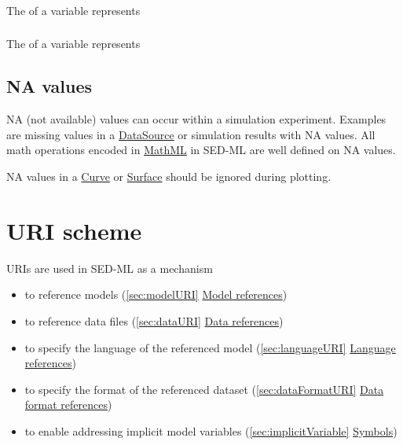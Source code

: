 
\subsubsection*{}
\label{fun:gamma}
The \sedgamma of a variable represents 

\subsubsection*{}
\label{fun:poisson}
The \poisson of a variable represents 




\subsection{NA values}
NA (not available) values can occur within a simulation experiment. Examples are missing values in a \hyperref[class:dataSource]{DataSource} or simulation results with NA values. All math operations encoded in \hyperref[sec:mathML]{MathML} in SED-ML are well defined on NA values. 

NA values in a \hyperref[class:curve]{Curve} or \hyperref[class:surface]{Surface} should be ignored during plotting.
  
\section{URI scheme}  
\label{sec:uriScheme}
URIs are used in SED-ML as a mechanism
\begin{itemize}
	\item to reference models (\ref{sec:modelURI} \hyperref[sec:modelURI]{Model references})
	\item to reference data files (\ref{sec:dataURI} \hyperref[sec:dataURI]{Data references})
	\item to specify the language of the referenced model (\ref{sec:languageURI} \hyperref[sec:languageURI]{Language references})
	\item to specify the format of the referenced dataset (\ref{sec:dataFormatURI} \hyperref[sec:dataFormatURI]{Data format references})
	\item to enable addressing implicit model variables (\ref{sec:implicitVariable}  \hyperref[sec:implicitVariable]{Symbols})
\end{itemize}

